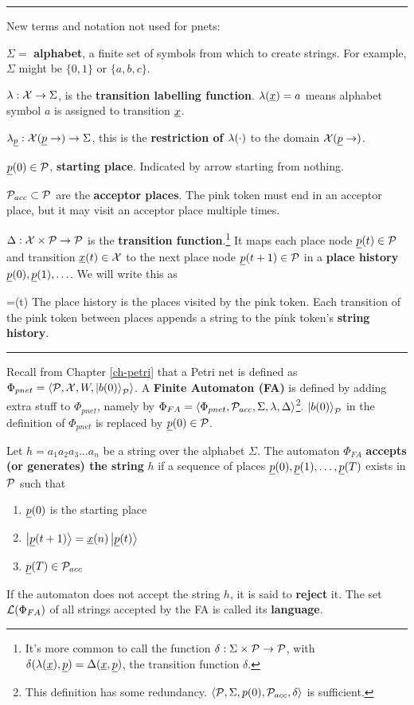 \hrule
New terms and notation not used for pnets:

$\Sigma=$ {\bf alphabet}, a finite set of symbols
from which to create strings. For example,
$\Sigma$ might be $\{0, 1\}$ or $\{a, b, c\}$.

$\lambda:{\cal X}\rightarrow\Sigma$, is the {\bf transition labelling function}. $\lam(\rvx)=a$ means alphabet symbol $a$ is assigned to transition $\rvx$.  


$\lam_\rvp:\calx(\rvp\rarrow)\rarrow\Sigma$, this is the {\bf restriction of $\lambda(\cdot)$}
to the domain $\calx(\rvp\rarrow)$.


$\rvp(0)\in \calp$, {\bf starting place}. Indicated by arrow starting from nothing.



${\cal P}_{acc}\subset {\cal P}$ are the 
{\bf acceptor places}. The pink token must end in an acceptor place, but it may visit
an acceptor place multiple times.


$\Delta:{\cal X}\times{\cal P}\rightarrow {\cal P}$ is the 
{\bf transition function}.\footnote{It's more common to call the function $\delta:\Sigma\times{\cal P}\rightarrow {\cal P}$, with $\delta(\lam(\rvx), \rvp)=\Delta(\rvx, \rvp)$, 
the
transition function $\delta$.}
It maps each place node $\rvp(t)\in\calp$ and transition $\rvx(t)\in\calx$ to the next place node $\rvp(t+1)\in\calp$ in a {\bf place history} $\rvp(0), \rvp(1), \ldots$. We will write this as

\beq
{}=\rvx(t)
\eeq
The place history is the places visited by the pink token. Each transition of
the pink token  between places appends a string
to the pink token's {\bf string history}.




\hrule
Recall from Chapter \ref{ch-petri} that a Petri net is defined as $\Phi_{pnet} = \left\langle{\cal P}, {\cal X}, W,\left|b(0)\right\rangle_{\cal P}\right\rangle$.
A {\bf Finite Automaton (FA)}
is defined by adding extra stuff to
$\Phi_{pnet}$, namely by
$\Phi_{FA}=\left\langle\Phi_{pnet},{\cal P}_{acc}, \Sigma, \lambda, \Delta\right\rangle$\footnote{This definition has some redundancy.  
$\left\langle{\cal P}, \Sigma, p(0), {\cal P}_{acc}, \delta\right\rangle$
is sufficient.}.
$\left|b(0)\right\rangle_{\cal P}$ in the definition
of $\Phi_{pnet}$ is replaced by
$\rvp(0)\in\calp$.

Let $h=a_1a_2a_3\ldots a_n$ be a string
over the alphabet $\Sigma$.
The automaton $\Phi_{FA}$ {\bf accepts (or generates) the string} $h$
if a sequence of places $\rvp(0), \rvp(1), \ldots, \rvp(T)$ exists
in ${\cal P}$ such that 
\begin{enumerate}
\item $\rvp(0)$  is the starting place
\item $\ket{\rvp(t+1) }= \rvx(n)\ket{\rvp(t)}$
\item $\rvp(T)\in \calp_{acc}$
\end{enumerate}
If the automaton does not accept the string $h$,
it is said to {\bf reject} it. The set ${\cal L}(\Phi_{FA})$ of all strings 
accepted by the FA is called its {\bf language}.

